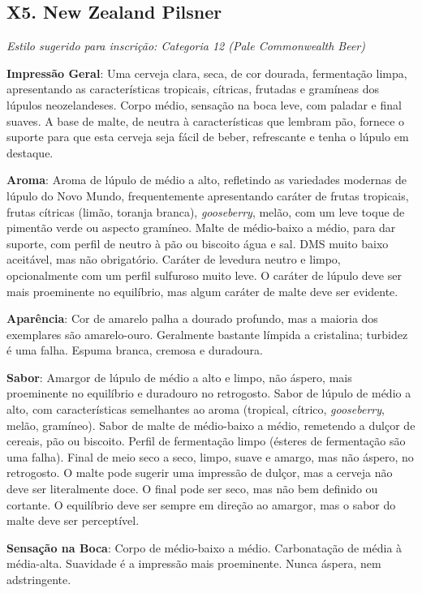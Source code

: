 \subsection*{X5. New Zealand Pilsner}

\textit{Estilo sugerido para inscrição: Categoria 12 (Pale Commonwealth Beer)}

\textbf{Impressão Geral}: Uma cerveja clara, seca, de cor dourada, fermentação limpa, apresentando as características tropicais, cítricas, frutadas e gramíneas dos lúpulos neozelandeses. Corpo médio, sensação na boca leve, com paladar e final suaves. A base de malte, de neutra à características que lembram pão, fornece o suporte para que esta cerveja seja fácil de beber, refrescante e tenha o lúpulo em destaque.

\textbf{Aroma}: Aroma de lúpulo de médio a alto, refletindo as variedades modernas de lúpulo do Novo Mundo, frequentemente apresentando caráter de frutas tropicais, frutas cítricas (limão, toranja branca), \textit{gooseberry}, melão, com um leve toque de pimentão verde ou aspecto gramíneo. Malte de médio-baixo a médio, para dar suporte, com perfil de neutro à pão ou biscoito água e sal. DMS muito baixo aceitável, mas não obrigatório. Caráter de levedura neutro e limpo, opcionalmente com um perfil sulfuroso muito leve. O caráter de lúpulo deve ser mais proeminente no equilíbrio, mas algum caráter de malte deve ser evidente.

\textbf{Aparência}: Cor de amarelo palha a dourado profundo, mas a maioria dos exemplares são amarelo-ouro. Geralmente bastante límpida a cristalina; turbidez é uma falha. Espuma branca, cremosa e duradoura.

\textbf{Sabor}: Amargor de lúpulo de médio a alto e limpo, não áspero, mais proeminente no equilíbrio e duradouro no retrogosto. Sabor de lúpulo de médio a alto, com características semelhantes ao aroma (tropical, cítrico, \textit{gooseberry}, melão, gramíneo). Sabor de malte de médio-baixo a médio, remetendo a dulçor de cereais, pão ou biscoito. Perfil de fermentação limpo (ésteres de fermentação são uma falha). Final de meio seco a seco, limpo, suave e amargo, mas não áspero, no retrogosto. O malte pode sugerir uma impressão de dulçor, mas a cerveja não deve ser literalmente doce. O final pode ser seco, mas não bem definido ou cortante. O equilíbrio deve ser sempre em direção ao amargor, mas o sabor do malte deve ser perceptível.

\textbf{Sensação na Boca}: Corpo de médio-baixo a médio. Carbonatação de média à média-alta. Suavidade é a impressão mais proeminente. Nunca áspera, nem adstringente.

